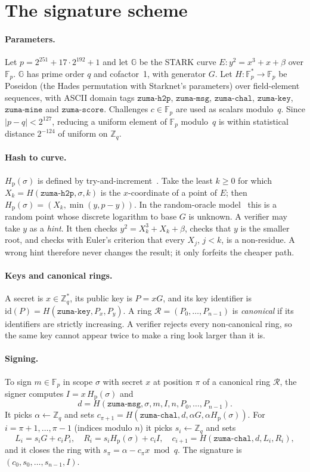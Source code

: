 \documentclass[11pt]{article}
\theoremstyle{remark}
\newcommand{\G}{\mathbb{G}}
\newcommand{\Fp}{\mathbb{F}_p}
\newcommand{\Zq}{\mathbb{Z}_q}
\newcommand{\Hp}{H_{\mathrm{p}}}
\newcommand{\Hs}{H}
\newcommand{\Ring}{\mathcal{R}}
\newcommand{\str}[1]{\texttt{#1}}
\begin{document}
\section{The signature scheme}\label{sec:scheme}

\paragraph{Parameters.} Let $p = 2^{251} + 17\cdot 2^{192} + 1$ and let $\G$ be the STARK curve $E: y^2 = x^3 + x + \beta$ over $\Fp$. $\G$ has prime order $q$ and cofactor~1, with generator $G$. Let $\Hs:\Fp^{*}\to\Fp$ be Poseidon (the Hades permutation with Starknet's parameters) over field-element sequences, with ASCII domain tags $\str{zuma-h2p}$, $\str{zuma-msg}$, $\str{zuma-chal}$, $\str{zuma-key}$, $\str{zuma-mine}$ and $\str{zuma-score}$. Challenges $c\in\Fp$ are used as scalars modulo~$q$. Since $|p-q| < 2^{127}$, reducing a uniform element of $\Fp$ modulo~$q$ is within statistical distance $2^{-124}$ of uniform on $\Zq$.

\paragraph{Hash to curve.} $\Hp(\sigma)$ is defined by try-and-increment~\cite{bls01}. Take the least $k\ge0$ for which $X_k = \Hs(\str{zuma-h2p},\sigma,k)$ is the $x$-coordinate of a point of $E$; then $\Hp(\sigma) = (X_k, \min(y,p-y))$. In the random-oracle model~\cite{bellare93} this is a random point whose discrete logarithm to base $G$ is unknown. A verifier may take $y$ as a \emph{hint}. It then checks $y^2 = X_k^3+X_k+\beta$, checks that $y$ is the smaller root, and checks with Euler's criterion that every $X_j$, $j<k$, is a non-residue. A wrong hint therefore never changes the result; it only forfeits the cheaper path.

\paragraph{Keys and canonical rings.} A secret is $x\in\Zq^{*}$, its public key is $P = xG$, and its key identifier is $\mathrm{id}(P) = \Hs(\str{zuma-key},P_x,P_y)$. A ring $\Ring = (P_0,\ldots,P_{n-1})$ is \emph{canonical} if its identifiers are strictly increasing. A verifier rejects every non-canonical ring, so the same key cannot appear twice to make a ring look larger than it is.

\paragraph{Signing.} To sign $m\in\Fp$ in scope $\sigma$ with secret $x$ at position $\pi$ of a canonical ring $\Ring$, the signer computes $I = x\,\Hp(\sigma)$ and
\[ d = \Hs(\str{zuma-msg}, \sigma, m, I, n, P_0,\ldots,P_{n-1}). \]
It picks $\alpha \gets \Zq$ and sets $c_{\pi+1} = \Hs(\str{zuma-chal}, d, \alpha G, \alpha\Hp(\sigma))$. For $i = \pi+1,\ldots,\pi-1$ (indices modulo $n$) it picks $s_i\gets\Zq$ and sets
\[ L_i = s_iG + c_iP_i,\quad R_i = s_i\Hp(\sigma) + c_iI,\quad c_{i+1} = \Hs(\str{zuma-chal}, d, L_i, R_i), \]
and it closes the ring with $s_\pi = \alpha - c_\pi x \bmod q$. The signature is $(c_0, s_0,\ldots,s_{n-1}, I)$.
\end{document}
